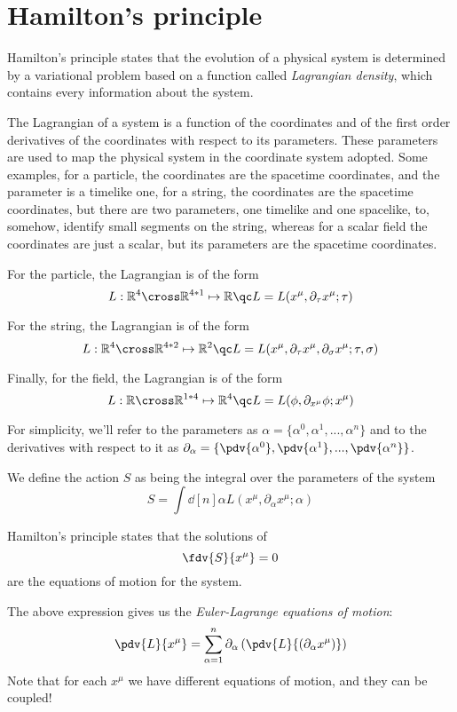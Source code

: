 \documentclass{myclass}
\begin{document}
\section{Hamilton's principle}
Hamilton's principle states that the evolution of a physical system is determined by a variational problem based on a function called \textit{Lagrangian density}, which contains every information about the system.\par
The Lagrangian of a system is a function of the coordinates and of the first order derivatives of the coordinates with respect to its parameters. These parameters are used to map the physical system in the coordinate system adopted. Some examples, for a particle, the coordinates are the spacetime coordinates, and the parameter is a timelike one, for a string, the coordinates are the spacetime coordinates, but there are two parameters, one timelike and one spacelike, to, somehow, identify small segments on the string, whereas for a scalar field the coordinates are just a scalar, but its parameters are the spacetime coordinates.\par
For the particle, the Lagrangian is of the form \[L: \mathbb{R}^4 \cross \mathbb{R}^{4*1} \mapsto \mathbb{R}\qc L=L(x^{\mu}, \partial_ {\tau}x^{\mu}; \tau) \]\par
For the string, the Lagrangian is of the form \[ L: \mathbb{R}^4 \cross \mathbb{R}^{4*2} \mapsto \mathbb{R}^2\qc L = L(x^{\mu}, \partial_{\tau}x^{\mu}, \partial_{\sigma}x^{\mu};\tau, \sigma)\]\par
Finally, for the field, the Lagrangian is of the form \[L: \mathbb{R} \cross \mathbb{R}^{1*4} \mapsto \mathbb{R}^4\qc L = L (\phi, \partial_{x^{\mu}}\phi; x^{\mu})\]\par

For simplicity, we'll refer to the parameters as \( \alpha = \{ \alpha^0, \alpha^1,...,\alpha^n\}\) and to the derivatives with respect to it as \(\partial_{\alpha} = \{\pdv{\alpha^0}, \pdv{\alpha^1},...,\pdv{\alpha^n} \} \).\par

We define the action \(S\) as being the integral over the parameters of the system
\[S = \int \dd[n]{\alpha} L(x^{\mu}, \partial_{\alpha}x^{\mu};\alpha) \]\par
Hamilton's principle states that the solutions of
\[\fdv{S}{x^{\mu}}=0 \]
are the equations of motion for the system.\par
The above expression gives us the \textit{Euler-Lagrange equations of motion}:
\[ \pdv{L}{x^{\mu}} = \sum_{\alpha=1}^n \partial_{\alpha}\left(\pdv{L}{\left(\partial_{\alpha}x^{\mu}\right)} \right) \]
Note that for each \(x^{\mu} \) we have different equations of motion, and they can be coupled!
\end{document}
